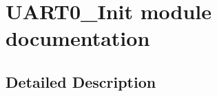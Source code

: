 \hypertarget{group___u_a_r_t0___init__module}{}\section{U\+A\+R\+T0\+\_\+\+Init module documentation}
\label{group___u_a_r_t0___init__module}


\subsection{Detailed Description}
